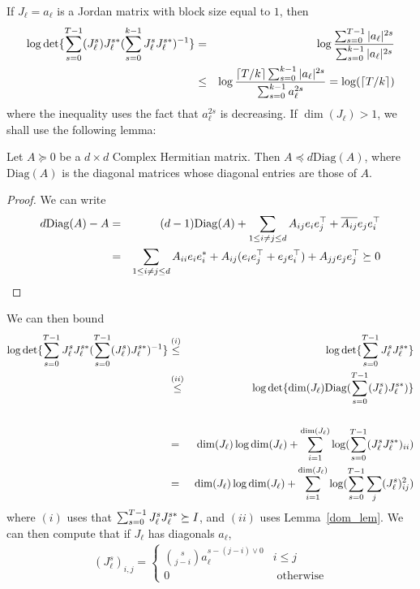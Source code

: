 If $J_{\ell} = a_{\ell}$ is a Jordan matrix with block size equal to $1$, then 
\begin{eqnarray*}
\log \det \{\sum_{s=0}^{T-1} (J_{\ell}^s)J_{\ell}^{s*}(\sum_{s=0}^{k-1} J_{\ell}^sJ_{\ell}^{s*})^{-1} \} &=& \log \frac{\sum_{s=0}^{T-1} |a_{\ell}|^{2s}}{\sum_{s=0}^{k-1}|a_{\ell}|^{2s}}\\
&\le& \log \frac{\lceil T/k\rceil\sum_{s=0}^{k-1} |a_{\ell}|^{2s}}{\sum_{s=0}^{k-1}a_{\ell}^{2s}} = \log(\lceil T/k\rceil)\\
\end{eqnarray*}
where the inequality uses the fact that $a_{\ell}^{2s}$ is decreasing. If $\dim (J_{\ell}) > 1$, we shall use the following lemma:
\begin{lem}\label{dom_lem} Let $A \succeq 0$ be a $d \times d$ Complex Hermitian matrix. Then $A \preceq d \mathrm{Diag}(A)$, where $\mathrm{Diag}(A)$ is the diagonal matrices whose diagonal entries are those of $A$. 
\end{lem}
\begin{proof}
We can write
\begin{eqnarray*}
d\mathrm{Diag}(A) - A &=&  (d-1)\mathrm{Diag}(A) +  \sum_{1 \le i \ne j \le d} A_{ij}e_ie_j^{\top} + \overline{A_{ij}}e_je_i^{\top}\\
&=&   \sum_{1 \le i \ne j \le d} A_{ii}e_{i}e_i^* + A_{ij}(e_ie_j^{\top} + e_je_i^\top) + A_{jj}e_{j}e_j^\top \succeq 0
\end{eqnarray*}
\end{proof}
We can then bound 
\begin{eqnarray*}
\log \det \{\sum_{s=0}^{T-1} J_{\ell}^sJ_{\ell}^{s*}(\sum_{s=0}^{T-1} (J_{\ell}^s)J_{\ell}^{s*})^{-1} \} &\overset{(i)}{\le}& \log \det \{\sum_{s=0}^{T-1} J_{\ell}^sJ_{\ell}^{s*} \} \\
&\overset{(ii)}{\le}& \log \det \{\dim(J_{\ell})\mathrm{Diag}(\sum_{s=0}^{T-1} (J_{\ell}^s)J_{\ell}^{s*}) \} \\\\
&=& \dim(J_{\ell})\log \dim(J_{\ell}) + \sum_{i=1}^{\dim(J_{\ell})} \log (\sum_{s=0}^{T-1}(J_{\ell}^sJ_{\ell}^{s*})_{ii} ) \\
&=&\dim(J_{\ell})\log \dim(J_{\ell}) + \sum_{i=1}^{\dim(J_{\ell})} \log (\sum_{s=0}^{T-1}\sum_{j}(J_{\ell}^s)_{ij}^2) 
\end{eqnarray*}
where $(i)$ uses that $\sum_{s=0}^{T-1} J_{\ell}^sJ_{\ell}^{s*} \succeq I$, and $(ii)$ uses Lemma~\ref{dom_lem}. We can then compute that if $J_{\ell}$ has diagonals $a_{\ell}$,
\begin{eqnarray*}
(J_{\ell}^s)_{i,j} = \begin{cases} \binom{s}{j - i}a_{\ell}^{s - (j-i)\vee 0} & i \le j \\
0 & \text{ otherwise} \end{cases}
\end{eqnarray*}
